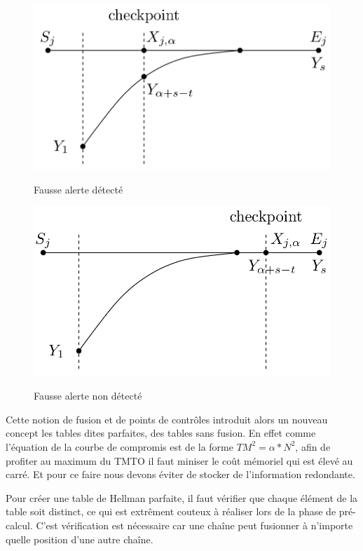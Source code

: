 \begin{figure}[h!]
	\begin{minipage}{.5\textwidth}
		\includegraphics[width=0.9\linewidth]{other/FalseAlarmDetected.png}
		\caption{}{Fausse alerte détecté}
	\end{minipage}
	\begin{minipage}{.5\textwidth}
	    \includegraphics[width=0.9\linewidth]{other/FalseAlarmNotDetected.png}
		\caption{}{Fausse alerte non détecté}
  	\end{minipage}
\end{figure}


	Cette notion de fusion et de points de contrôles introduit alors un nouveau concept les tables dites parfaites, des tables sans fusion. En effet comme l'équation de la courbe de compromis est de la forme $TM^2=\alpha *N^2$, afin de profiter au maximum du \gls{TMTO} il faut miniser le coût mémoriel qui est élevé au carré. Et pour ce faire nous devons éviter de stocker de l'information redondante.
	
	\bigskip
	
	Pour créer une table de Hellman parfaite, il faut vérifier que chaque élément de la table soit distinct, ce qui est extrêment couteux à réaliser lors de la phase de pré-calcul. C'est vérification est nécessaire car une chaîne peut fusionner à n'importe quelle position d'une autre chaîne.
	
